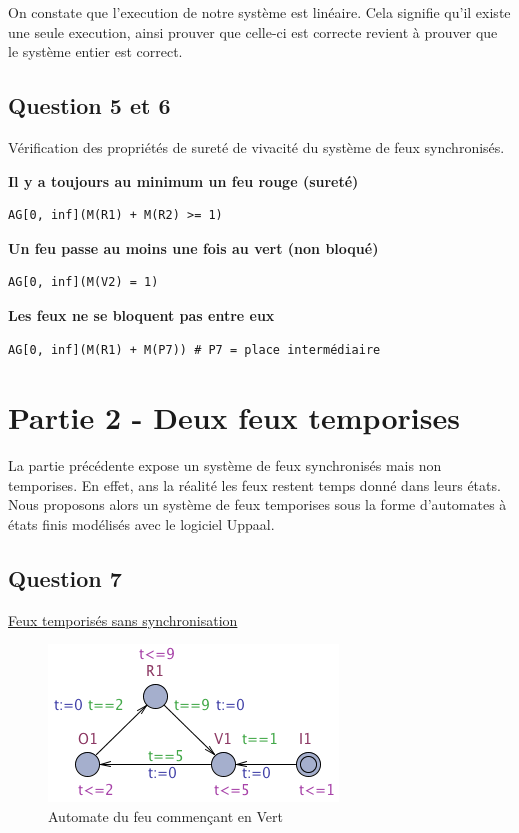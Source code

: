 \documentclass[11pt]{article}
\begin{document}
On constate que l'execution de notre système est linéaire. Cela signifie qu'il existe une seule execution, ainsi prouver que celle-ci est correcte revient à prouver que le système entier est correct.

\subsection{Question 5 et 6}

Vérification des propriétés de sureté de vivacité du système de feux synchronisés.

\textbf{Il y a toujours au minimum un feu rouge (sureté)}
\begin{verbatim}
AG[0, inf](M(R1) + M(R2) >= 1)	
\end{verbatim}

\textbf{Un feu passe au moins une fois au vert (non bloqué)}
\begin{verbatim}
AG[0, inf](M(V2) = 1)	
\end{verbatim}
	
\textbf{Les feux ne se bloquent pas entre eux}
\begin{verbatim}
AG[0, inf](M(R1) + M(P7)) # P7 = place intermédiaire	
\end{verbatim}

\section{Partie 2 - Deux feux temporises}
La partie précédente expose un système de feux synchronisés mais non temporises. En effet, ans la réalité les feux restent temps donné dans leurs états. Nous proposons alors un système de feux temporises sous la forme d'automates à états finis modélisés avec le logiciel Uppaal.

\subsection{Question 7}

\href{https://github.com/masters-info-nantes/hong-cheng-lv/blob/master/ressources/part2/Q7-FeuxTemporises.xml}{Feux temporisés sans synchronisation}

\begin{figure}[H]
	\centering
	\includegraphics{ressources/part2/Q7-1.png}
	\caption{Automate du feu commençant en Vert}
\end{figure}
\end{document}
